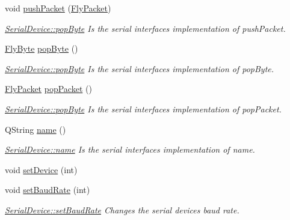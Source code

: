 \begin{DoxyCompactItemize}
void \hyperlink{class_serial_device_a35408d01afb4c48bc259dc601d2b0bf7}{push\+Packet} (\hyperlink{class_fly_packet}{Fly\+Packet})
\begin{DoxyCompactList}\small\item\em \hyperlink{class_serial_device_aa48df17f28ab9f613ba07181487a39c9}{Serial\+Device\+::pop\+Byte} Is the serial interface\textquotesingle{}s implementation of push\+Packet. \end{DoxyCompactList}\item 
\hyperlink{conversions_8h_a1f006e31a957accfe6aa1bf6f401efce}{Fly\+Byte} \hyperlink{class_serial_device_aa48df17f28ab9f613ba07181487a39c9}{pop\+Byte} ()
\begin{DoxyCompactList}\small\item\em \hyperlink{class_serial_device_aa48df17f28ab9f613ba07181487a39c9}{Serial\+Device\+::pop\+Byte} Is the serial interface\textquotesingle{}s implementation of pop\+Byte. \end{DoxyCompactList}\item 
\hyperlink{class_fly_packet}{Fly\+Packet} \hyperlink{class_serial_device_ac581710eb5e03945d9b3de9d39be51fc}{pop\+Packet} ()
\begin{DoxyCompactList}\small\item\em \hyperlink{class_serial_device_aa48df17f28ab9f613ba07181487a39c9}{Serial\+Device\+::pop\+Byte} Is the serial interface\textquotesingle{}s implementation of pop\+Packet. \end{DoxyCompactList}\item 
Q\+String \hyperlink{class_serial_device_a97092ec9379ed561866dad21475ea331}{name} ()
\begin{DoxyCompactList}\small\item\em \hyperlink{class_serial_device_a97092ec9379ed561866dad21475ea331}{Serial\+Device\+::name} Is the serial interface\textquotesingle{}s implementation of name. \end{DoxyCompactList}\item 
void \hyperlink{class_serial_device_a38f5d9bc555bb1df0a4c8413e494d4b3}{set\+Device} (int)
\item 
void \hyperlink{class_serial_device_af06c6a34b54819e71186243a38606280}{set\+Baud\+Rate} (int)
\begin{DoxyCompactList}\small\item\em \hyperlink{class_serial_device_af06c6a34b54819e71186243a38606280}{Serial\+Device\+::set\+Baud\+Rate} Changes the serial device\textquotesingle{}s baud rate. \end{DoxyCompactList}\item 

\end{DoxyCompactItemize}
